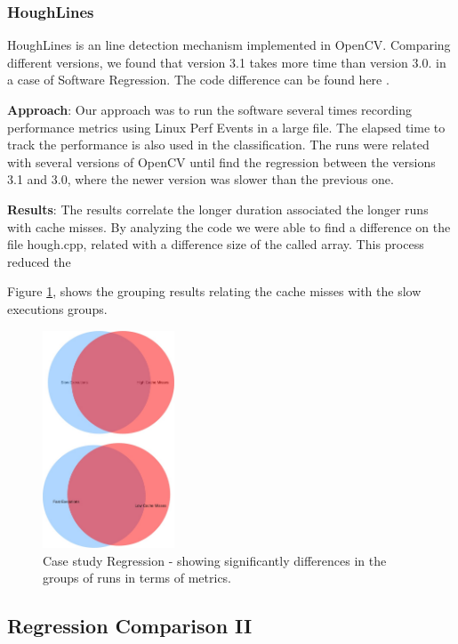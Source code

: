 \subsubsection{HoughLines} 
HoughLines is an line detection mechanism implemented in OpenCV. Comparing different versions, we found that version 3.1 takes more time than version 3.0. in a case of Software Regression. The code difference can be found here \cite{opencv_source_diff}.

\textbf{Approach}: Our approach was to run the software several times recording performance metrics using Linux Perf Events in a large file. The elapsed time to track the performance is also used in the classification. The runs were related with several versions of OpenCV until find the regression between the versions 3.1 and 3.0, where the newer version was slower than the previous one.


\textbf{Results}: The results correlate the longer duration associated the longer runs with cache misses. By analyzing the code we were able to find a difference on the file hough.cpp, related with a difference size of the called array. This process reduced the 
    
    Figure \ref{fig:case2}, shows the grouping results relating the cache misses with the slow executions groups.
    
    \begin{figure}[h]
          \centering
            \includegraphics[width=0.350\textwidth]{figures/set_results_cache.jpg}
            \caption{Case study Regression - showing significantly differences in the groups of runs in terms of metrics.}
            \label{fig:case2}
    \end{figure}
    
\subsection{\textbf{Regression Comparison II}}
    
